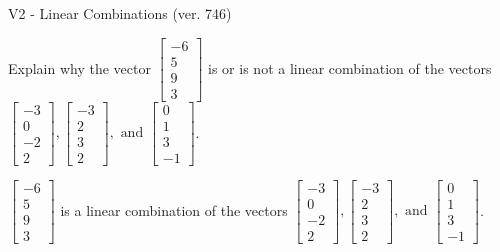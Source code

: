 \begin{exercise}
  \begin{exerciseTitle}V2 - Linear Combinations (ver. 746)\end{exerciseTitle}
  \begin{exerciseStatement}
    Explain why the vector \(\left[\begin{array}{c}
-6 \\
5 \\
9 \\
3
\end{array}\right]\)  is or is not a linear 
	combination of the vectors \(\left[\begin{array}{c}
-3 \\
0 \\
-2 \\
2
\end{array}\right] , \left[\begin{array}{c}
-3 \\
2 \\
3 \\
2
\end{array}\right] , \text{ and } \left[\begin{array}{c}
0 \\
1 \\
3 \\
-1
\end{array}\right]\).
	


  \end{exerciseStatement}
  \begin{exerciseAnswer}
   \(\left[\begin{array}{c}
-6 \\
5 \\
9 \\
3
\end{array}\right]\) 
  	 is  
	a linear combination of the vectors \(\left[\begin{array}{c}
-3 \\
0 \\
-2 \\
2
\end{array}\right] , \left[\begin{array}{c}
-3 \\
2 \\
3 \\
2
\end{array}\right] , \text{ and } \left[\begin{array}{c}
0 \\
1 \\
3 \\
-1
\end{array}\right]\).

	
  


  \end{exerciseAnswer}
\end{exercise}